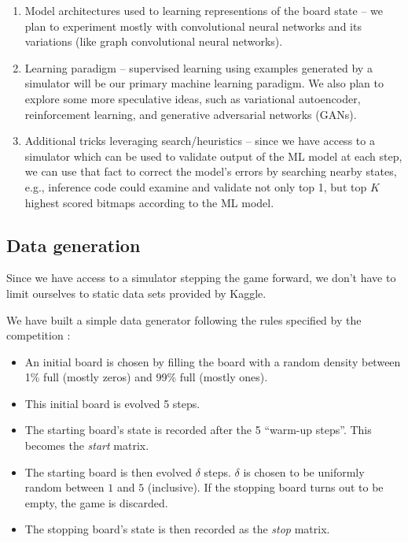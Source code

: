 \documentclass[conference]{IEEEtran}
\begin{document}
\begin{enumerate}
    \item Model architectures used to learning representions of the board state -- we plan to experiment mostly with convolutional neural networks and its variations (like graph convolutional neural networks).
    
    \item Learning paradigm -- supervised learning using examples generated by a simulator will be our primary machine learning paradigm. We also plan to explore some more speculative ideas, such as variational autoencoder, reinforcement learning, and generative adversarial networks (GANs).
    
    \item Additional tricks leveraging search/heuristics -- since we have access to a simulator which can be used to validate output of the ML model at each step, we can use that fact to correct the model's errors by searching nearby states, e.g., inference code could examine and validate not only top 1, but top $K$ highest scored bitmaps according to the ML model. 
    
    
\end{enumerate}

\subsection{Data generation}
Since we have access to a simulator stepping the game forward, we don't have to limit ourselves to static data sets provided by Kaggle.

We have built a simple data generator following the rules specified by the competition \cite{b1}:

\begin{itemize}
\item An initial board is chosen by filling the board with a random density between 1\% full (mostly zeros) and 99\% full (mostly ones).
\item This initial board is evolved 5 steps.
\item The starting board's state is recorded after the 5 ``warm-up steps''. This becomes the {\it start} matrix.
\item The starting board is then evolved $\delta$ steps. $\delta$ is chosen to be uniformly random between $1$ and $5$ (inclusive). If the stopping board turns out to be empty, the game is discarded.
\item The stopping board's state is then recorded as the {\it stop} matrix.
\end{itemize}
\end{document}
